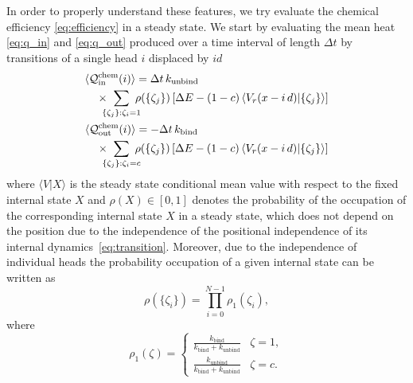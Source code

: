 \documentclass[aps,pre,twocolumn,showpacs,showkeys,superscriptaddress,floatfix]{revtex4-1}
\begin{document}
In order to properly understand these features, 
we try evaluate the chemical efficiency \eqref{eq:efficiency} in a steady state. 
We start by evaluating the mean heat \eqref{eq:q_in} and \eqref{eq:q_out} produced over a time interval of length $\Delta t$ 
by transitions of a single head $i$ displaced by $i d$  
\begin{gather*}
\begin{multlined}[b][.42\textwidth]
\langle \mathcal Q^\text{chem}_\text{in}(i) \rangle 
= \Delta t \, k_\text{unbind} 
\\ \times 
\!\!\!\! \sum\limits_{\{\zeta_j\} : \zeta_i = 1 } \!\!\!\! \rho(\{ \zeta_j \} ) 
\left[ \Delta E - (1-c) \left\langle V_r(x - i \, d ) \middle| \{ \zeta_j \} \right\rangle \right] 
\end{multlined}
\\
\begin{multlined}[b][.42\textwidth]
\langle \mathcal Q^\text{chem}_\text{out}(i) \rangle 
= - \Delta t \, k_\text{bind} 
\\ \times 
\!\!\!\! \sum\limits_{\{\zeta_j\} : \zeta_i = c } \!\!\!\! \rho(\{ \zeta_j \} ) 
\left[ \Delta E - (1-c) \left\langle V_r(x - i \, d ) \middle| \{ \zeta_j \} \right\rangle \right] 
\end{multlined}
\end{gather*}
where $\langle V | X \rangle$ is the steady state conditional mean value with respect to the fixed internal state $X$ 
and $\rho(X) \in [0,1]$ denotes the probability of the occupation of the corresponding internal state $X$ in a steady state, 
which does not depend on the position due to the independence of the positional independence of its internal dynamics~\eqref{eq:transition}. 
Moreover, due to the independence of individual heads the probability occupation of a given internal state can be written as 
\[
\rho( \{ \zeta_i \} ) = \prod_{i=0}^{N-1} \rho_1( \zeta_i ), 
\]  
where 
\[
\rho_1(\zeta) = \begin{cases} 
\frac{ k_\text{bind} }{ k_\text{bind} + k_\text{unbind} } & \zeta = 1 , \\
\frac{ k_\text{unbind} }{ k_\text{bind} + k_\text{unbind} } & \zeta = c . 
\end{cases} 
\]
\end{document}
